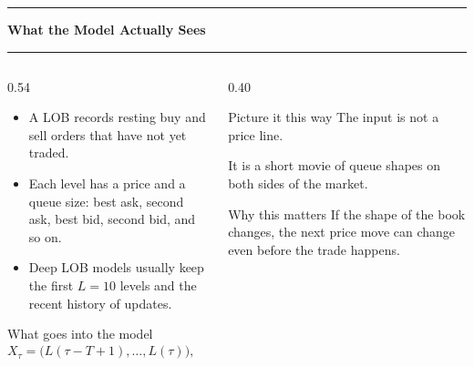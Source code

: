 \documentclass[aspectratio=169,10pt]{beamer}
\newcommand{\tightitems}{\setlength{\itemsep}{0.35em}}
\newcommand{\contentheader}[1]{%
  \vspace*{0.05em}%
  {\noindent\color{BrandOrange}\rule{0.42em}{0.42em}\hspace{0.50em}\bfseries\Large #1\par}%
  \vspace{0.15em}%
  {\color{BrandOrange}\rule{\textwidth}{1.4pt}\par}%
  \vspace{0.42em}%
}
\begin{document}
\begin{frame}[plain]
\contentheader{What the Model Actually Sees}
\begin{columns}[T,totalwidth=\textwidth]
\begin{column}{0.54\textwidth}
\begin{itemize}\tightitems
  \item A LOB records resting buy and sell orders that have not yet traded.
  \item Each level has a price and a queue size: best ask, second ask, best bid, second bid, and so on.
  \item Deep LOB models usually keep the first \(L=10\) levels and the recent history of updates.
\end{itemize}
\vspace{0.25em}
\begin{block}{What goes into the model}
\[
X_\tau =
\big(L(\tau-T+1),\ldots,L(\tau)\big),
\qquad
X_\tau\in\mathbb{R}^{T\times4L}
\]
\end{block}
\end{column}
\begin{column}{0.40\textwidth}
\begin{block}{Picture it this way}
The input is not a price line.

It is a short movie of queue shapes on both sides of the market.
\end{block}
\begin{block}{Why this matters}
If the shape of the book changes, the next price move can change even before the trade happens.
\end{block}
\end{column}
\end{columns}
\end{frame}
\end{document}
